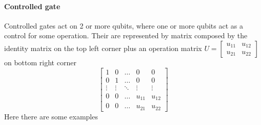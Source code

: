 \documentclass[main.tex]{subfiles}
\theoremstyle{definition}
\begin{document}
	\paragraph{Controlled gate}
	Controlled gates act on 2 or more qubits, where one or more qubits act as a control for some 
	operation. Their are represented by matrix composed by the identity matrix on the top left corner plus an operation matrix 
	$
	U=
	\begin{bmatrix}
	u_{11} & u_{12}\\
	u_{21} & u_{22}
	\end{bmatrix}
	$
	on bottom right corner
	\begin{equation}
	\begin{bmatrix}
	1 & 0 & \dots & 0 & 0\\
	0 & 1 & \dots & 0 & 0\\
	\vdots & \vdots & \ddots & \vdots & \vdots\\
	0 & 0 & \dots & u_{11} & u_{12}\\
	0 & 0 & \dots & u_{21} & u_{22}
	\end{bmatrix}
	\end{equation}
	Here there are some examples
\end{document}
